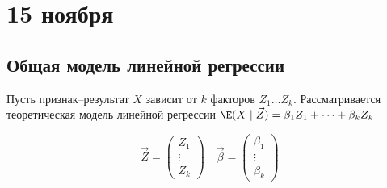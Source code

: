 \chapter{15 ноября}

\section{Общая модель линейной регрессии}

Пусть признак--результат \(X\) зависит от \(k\) факторов \(Z_1 \dots Z_k\). Рассматривается теоретическая модель линейной регрессии \(\E(X \mid \vec{Z}) = \beta_1Z_1 + \dots + \beta_kZ_k\)

\begin{obozn}
    \[\vec{Z} = \begin{pmatrix}
            Z_1    \\
            \vdots \\
            Z_k
        \end{pmatrix} \quad \vec{\beta} = \begin{pmatrix}
            \beta_1 \\
            \vdots  \\
            \beta_k
        \end{pmatrix}\]
\end{obozn}

